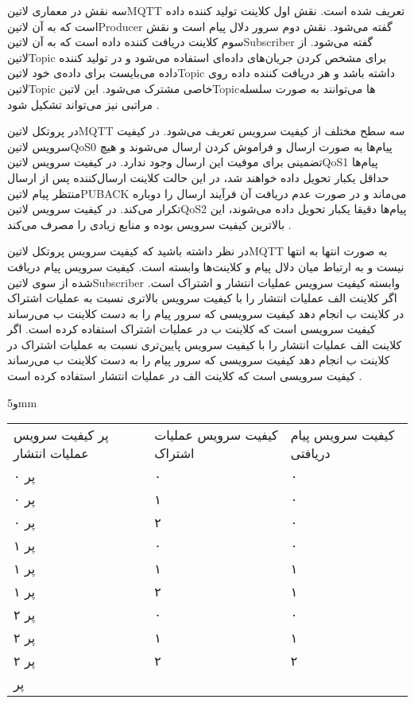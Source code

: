 سه نقش در معماری ‌لاتین{MQTT} تعریف شده است. نقش اول کلاینت تولید کننده داده است که به آن ‌لاتین{Producer} گفته می‌شود. نقش دوم سرور دلال پیام است و نقش سوم کلاینت دریافت کننده داده است که به آن ‌لاتین{Subscriber} گفته می‌شود.
از ‌لاتین{Topic} برای مشخص کردن جریان‌های داده‌ای استفاده می‌شود و در تولید کننده داده می‌بایست برای داده‌ی خود ‌لاتین{Topic} داشته باشد و هر دریافت کننده داده روی ‌لاتین{Topic} خاصی مشترک می‌شود.
این ‌لاتین{Topic}ها می‌توانند به صورت سلسله مراتبی نیز می‌تواند تشکیل شود
.

در پروتکل ‌لاتین{‌MQTT} سه سطح مختلف از کیفیت سرویس تعریف می‌شود. در کیفیت سرویس ‌لاتین{QoS0} پیام‌ها به صورت ارسال و فراموش کردن ارسال می‌شوند و هیچ تضمینی برای موفیت این ارسال وجود ندارد.
در کیفیت سرویس ‌لاتین{QoS1} پیام‌ها حداقل یکبار تحویل داده خواهند شد، در این حالت کلاینت ارسال‌کننده پس از ارسال منتظر پیام ‌لاتین{PUBACK} می‌ماند و در صورت عدم دریافت آن فرآیند ارسال را دوباره تکرار می‌کند.
در کیفیت سرویس ‌لاتین{QoS2} پیام‌ها دقیقا یکبار تحویل داده می‌شوند، این بالاترین کیفیت سرویس بوده و منابع زیادی را مصرف می‌کند
.

در نظر داشته باشید که کیفیت سرویس پروتکل ‌لاتین{MQTT} به صورت انتها به انتها نیست و به ارتباط میان دلال پیام و کلاینت‌ها وابسته است.
کیفیت سرویس پیام دریافت شده از سوی ‌لاتین{Subscriber} وابسته کیفیت سرویس عملیات انتشار و اشتراک است. اگر کلاینت الف عملیات انتشار را با کیفیت سرویس بالاتری
نسبت به عملیات اشتراک در کلاینت ب انجام دهد کیفیت سرویسی که سرور پیام را به دست کلاینت ب می‌رساند کیفیت سرویسی است که کلاینت ب در عملیات اشتراک استفاده کرده است.
اگر کلاینت الف عملیات انتشار را با کیفیت سرویس پایین‌تری نسبت به عملیات اشتراک در کلاینت ب انجام دهد کیفیت سرویسی که سرور پیام را به دست کلاینت ب می‌رساند کیفیت سرویسی است که
کلاینت الف در عملیات انتشار استفاده کرده است
.

‌و{5mm}
\begin{tabularx}{\textwidth}{|X|X|X|}
‌پر
کیفیت سرویس عملیات انتشار & کیفیت سرویس عملیات اشتراک & کیفیت سرویس پیام دریافتی \\
‌پر
۰ & ۰ & ۰ \\
‌پر
۰ & ۱ & ۰ \\
‌پر
۰ & ۲ & ۰ \\
‌پر
۱ & ۰ & ۰ \\
‌پر
۱ & ۱ & ۱ \\
‌پر
۱ & ۲ & ۱ \\
‌پر
۲ & ۰ & ۰ \\
‌پر
۲ & ۱ & ۱ \\
‌پر
۲ & ۲ & ۲ \\
‌پر
\end{tabularx}

